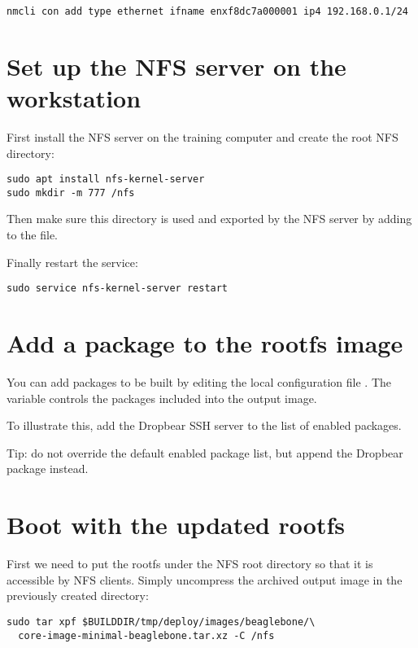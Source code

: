 \begin{verbatim}
nmcli con add type ethernet ifname enxf8dc7a000001 ip4 192.168.0.1/24
\end{verbatim}

\section{Set up the NFS server on the workstation}

First install the NFS server on the training computer and create the root NFS
directory:
\begin{verbatim}
sudo apt install nfs-kernel-server
sudo mkdir -m 777 /nfs
\end{verbatim}

Then make sure this directory is used and exported by the NFS server by adding
 to the
 file.

Finally restart the service:
\begin{verbatim}
sudo service nfs-kernel-server restart
\end{verbatim}

\section{Add a package to the rootfs image}

You can add packages to be built by editing the local configuration file
. The  variable controls the
packages included into the output image.

To illustrate this, add the Dropbear SSH server to the list of enabled
packages.

Tip: do not override the default enabled package list, but append the Dropbear
package instead.

\section{Boot with the updated rootfs}

First we need to put the rootfs under the NFS root directory so that it is
accessible by NFS clients. Simply uncompress the archived output image in the
previously created  directory:
\begin{verbatim}
sudo tar xpf $BUILDDIR/tmp/deploy/images/beaglebone/\
  core-image-minimal-beaglebone.tar.xz -C /nfs
\end{verbatim}

